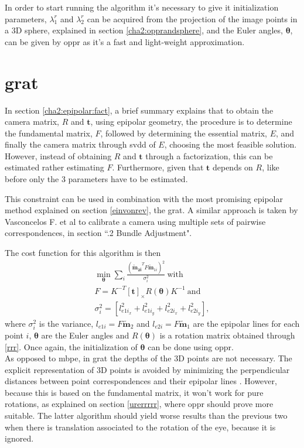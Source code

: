 In order to start running the algorithm it's necessary to give it initialization parameters, $\lambda_{1}^r$ and $\lambda_{2}^r$ can be acquired from the projection of the image points in a 3D sphere, explained in section \ref{cha2:opprandsphere}, and the Euler angles, $\mathbf{\theta}$, can be given by \acrlong{oppr} as it's a fast and light-weight approximation.

\section{\acrlong{grat}}
\label{fjeopfe}
In section \ref{cha2:epipolar:fact}, a brief summary explains that to obtain the camera matrix, $R$ and $\mathbf{t}$, using epipolar geometry, the procedure is to determine the fundamental matrix, $F$, followed by determining the essential matrix, $E$, and finally the camera matrix through \acrshort{svdd} of $E$, choosing the most feasible solution.\\
However, instead of obtaining $R$ and $\mathbf{t}$ through a factorization, this can be estimated rather estimating $F$. Furthermore, given that $\mathbf{t}$ depends on $R$, like before only the 3 parameters have to be estimated. 

This constraint can be used in combination with the most promising epipolar method explained on section \ref{einvonrev}, the \acrlong{grat}. A similar approach is taken by Vasconcelos F. et al \cite{vasconcelos}
to calibrate a camera using multiple sets of pairwise correspondences, in section ``.2 Bundle Adjustment". 

The cost function for this algorithm is then
\begin{align}
\min_\mathbf{\theta} \sum_i \frac{ (\mathbf{\widetilde{\mathbf{m}}_{2i}}^T F \widetilde{\mathbf{m}}_{1i})^2}{\sigma_i^2} \ \text{with}\\
F = K^{-T} [\mathbf{t}]_\times R(\mathbf{ \theta}) K^{-1} \ \text{and}\\
\label{dopewnrvno}
\sigma_i^2 =  [l_{{e1i}_x}^2 + l_{{e1i}_y}^2 + l_{{e2i}_x}^2 + l_{{e2i}_y}^2],
\end{align}
where $\sigma_i^2$ is the variance, $l_{e1i} = F\widetilde{\mathbf{m}}_{2}$ and $l_{e2i} = F\widetilde{\mathbf{m}}_{1}$ are the epipolar lines for each point $i$, $\mathbf{\theta}$ are the Euler angles and $R(\mathbf{ \theta})$ is a rotation matrix obtained through \ref{rrr}. Once again, the initialization of $\mathbf{ \theta}$ can be done using \acrlong{oppr}.\\

As opposed to \acrshort{mbpe}, in \acrshort{grat} the depths of the 3D points are not necessary. The explicit representation of 3D points is avoided by minimizing the perpendicular distances between point correspondences and their epipolar lines \cite{vasconcelos} \cite{bundle}.
However, because this is based on the fundamental matrix, it won't work for pure rotations, as explained on section \ref{urerrrrr}, where \acrshort{oppr} should prove more suitable. The latter algorithm should yield worse results than the previous two when there is translation associated to the rotation of the eye, because it is ignored.

